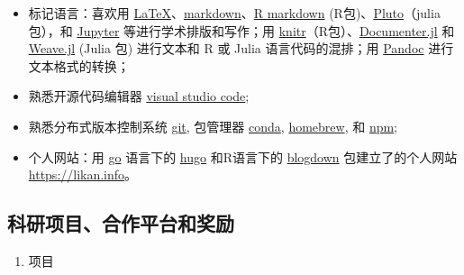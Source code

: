 \documentclass[
  12pt,
]{article}
\providecommand{\tightlist}{%
  \setlength{\itemsep}{0pt}\setlength{\parskip}{0pt}}
\begin{document}
\begin{itemize}
\item
  标记语言：喜欢用
  \href{https://www.latex-project.org}{LaTeX}、\href{https://daringfireball.net/projects/markdown/}{markdown}、\href{https://rmarkdown.rstudio.com}{R
  markdown}
  (R包)、\href{https://github.com/fonsp/Pluto.jl}{Pluto}（julia 包），和
  \href{https://jupyter.org}{Jupyter} 等进行学术排版和写作；用
  \href{https://cran.r-project.org/web/packages/knitr/index.html}{knitr}（R包）、\href{https://github.com/JuliaDocs/Documenter.jl}{Documenter.jl}
  和 \href{https://github.com/JunoLab/Weave.jl}{Weave.jl} (Julia 包)
  进行文本和 R 或 Julia 语言代码的混排；用
  \href{https://pandoc.org}{Pandoc} 进行文本格式的转换；
\item
  熟悉开源代码编辑器 \href{https://code.visualstudio.com}{visual studio
  code};
\item
  熟悉分布式版本控制系统 \href{https://git-scm.com}{git}, 包管理器
  \href{https://docs.conda.io/en/latest/}{conda},
  \href{https://brew.sh}{homebrew}, 和
  \href{https://www.npmjs.com}{npm};
\item
  个人网站：用 \href{https://golang.org}{go} 语言下的
  \href{https://gohugo.io}{hugo} 和R语言下的
  \href{https://github.com/rstudio/blogdown}{blogdown}
  包建立了的个人网站 \url{https://likan.info}。
\end{itemize}

\hypertarget{ux79d1ux7814ux9879ux76eeux5408ux4f5cux5e73ux53f0ux548cux5956ux52b1}{%
\subsection{科研项目、合作平台和奖励}\label{ux79d1ux7814ux9879ux76eeux5408ux4f5cux5e73ux53f0ux548cux5956ux52b1}}

\begin{enumerate}
\def\labelenumi{\arabic{enumi}.}
\tightlist
\item
  项目
\end{enumerate}
\end{document}
